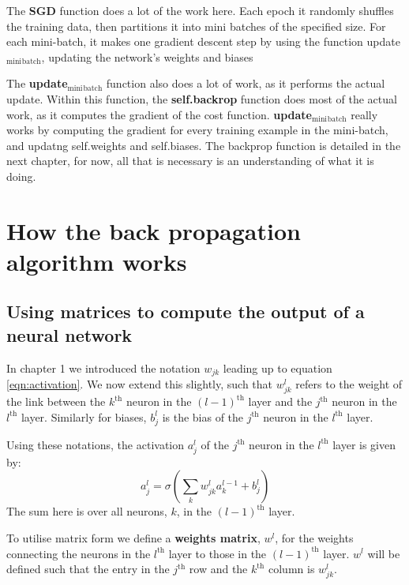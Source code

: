\documentclass[11pt]{article}
\begin{document}
The \textbf{SGD} function does a lot of the work here. Each epoch it randomly shuffles the training data, then partitions it into mini batches of the specified size. For each mini-batch, it makes one gradient descent step by using the function update\(_{\text{mini}}\)\(_{\text{batch}}\), updating the network's weights and biases

The \textbf{update\(_{\text{mini}}\)\(_{\text{batch}}\)} function also does a lot of work, as it performs the actual update. Within this function, the \textbf{self.backrop} function does most of the actual work, as it computes the gradient of the cost function. \textbf{update\(_{\text{mini}}\)\(_{\text{batch}}\)} really works by computing the gradient for every training example in the mini-batch, and updatng self.weights and self.biases. The backprop function is detailed in the next chapter, for now, all that is necessary is an understanding of what it is doing.

\clearpage


\section{How the back propagation algorithm works}
\label{sec:org5a70fa5}
\subsection{Using matrices to compute the output of a neural network}
\label{sec:org3fe5676}
In chapter 1 we introduced the notation \(w_{jk}\) leading up to equation \ref{eqn:activation}. We now extend this slightly, such that \(w^l_{jk}\) refers to the weight of the link between the \(k^{\text{th}}\) neuron in the \((l-1)^{\text{th}}\) layer and the \(j^{\text{th}}\) neuron in the \(l^{\text{th}}\) layer. Similarly for biases, \(b^l_j\) is the bias of the \(j^{\text{th}}\) neuron in the \(l^{\text{th}}\) layer.

Using these notations, the activation \(a^l_j\) of the \(j^{\text{th}}\) neuron in the \(l^{\text{th}}\) layer is given by:
\begin{equation} \label{eqn:alj}
a^l_j = \sigma ( \sum_k w^l_{jk} a^{l-1}_k + b^l_j )
\end{equation}
The sum here is over all neurons, \(k\), in the \((l-1)^{\text{th}}\) layer.

\vspace{0.3cm}

To utilise matrix form we define a \textbf{weights matrix}, \(w^l\), for the weights connecting the neurons in the \(l^{\text{th}}\) layer to those in the \((l-1)^{\text{th}}\) layer. \(w^l\) will be defined such that the entry in the \(j^{\text{th}}\) row and the \(k^{\text{th}}\) column is \(w^l_{jk}\).
\end{document}
